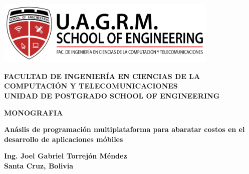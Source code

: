 \begin{titlepage}
    \begin{center}
        \includegraphics[width=0.8\textwidth]{images/logo_soe.png} \\
        \vspace{1cm}

        {\fontsize{18pt}{10pt}\selectfont\textbf{FACULTAD DE INGENIERÍA EN CIENCIAS DE LA COMPUTACIÓN Y TELECOMUNICACIONES}} \\
        \vspace{2cm}
        {\fontsize{18pt}{5pt}\selectfont\textbf{UNIDAD DE POSTGRADO SCHOOL OF ENGINEERING}} \\
        \vspace{0.5cm}
        
        \vspace{0.5cm}
        {\fontsize{20pt}{5pt}\selectfont\textbf{MONOGRAFIA}} \\
        \vspace{1cm}
        
        {\fontsize{16pt}{5pt}\selectfont\textbf{Anáslis de programación multiplataforma para abaratar costos en el desarrollo de aplicaciones móbiles}} \\
        \vspace{1cm}
        
        \vspace{2cm}
        {\fontsize{14pt}{22pt}\selectfont\textbf{Ing. Joel Gabriel Torrejón Méndez}} \\
        
        \vfill
        \textbf{Santa Cruz, Bolivia} \\
    \end{center}
\end{titlepage}
    